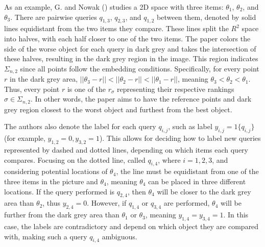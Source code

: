 \documentclass[
  letterpaper,
  numbers=noenddot,
  DIV=11]{scrreprt}
\theoremstyle{plain}
\theoremstyle{definition}
\theoremstyle{remark}
\begin{document}
As an example, G. and Nowak () studies a
2D space with three items: \(\theta_1\), \(\theta_2\), and \(\theta_3\).
There are pairwise queries \(q_{1,3}\), \(q_{2,3}\), and \(q_{1,2}\)
between them, denoted by solid lines equidistant from the two items they
compare. These lines split the \(R^2\) space into halves, with each half
closer to one of the two items. The paper colors the side of the worse
object for each query in dark grey and takes the intersection of these
halves, resulting in the dark grey region in the image. This region
indicates \(\Sigma_{n,2}\) since all points follow the embedding
conditions. Specifically, for every point \(r\) in the dark grey area,
\(||\theta_3 - r|| < ||\theta_2 - r|| < ||\theta_1 - r||\), meaning
\(\theta_3 < \theta_2 < \theta_1\). Thus, every point \(r\) is one of
the \(r_\sigma\) representing their respective rankings
\(\sigma \in \Sigma_{n,2}\). In other words, the paper aims to have the
reference points and dark grey region closest to the worst object and
furthest from the best object.

The authors also denote the label for each query \(q_{i,j}\), such as
label \(y_{i,j} = 1\{q_{i,j}\}\) (for example,
\(y_{1,2} = 0, y_{3,2} = 1\)). This allows for deciding how to label new
queries represented by dashed and dotted lines, depending on which items
each query compares. Focusing on the dotted line, called \(q_{i,4}\),
where \(i={1,2,3}\), and considering potential locations of
\(\theta_4\), the line must be equidistant from one of the three items
in the picture and \(\theta_4\), meaning \(\theta_4\) can be placed in
three different locations. If the query performed is \(q_{2,4}\), then
\(\theta_4\) will be closer to the dark grey area than \(\theta_2\),
thus \(y_{2,4} = 0\). However, if \(q_{1,4}\) or \(q_{3,4}\) are
performed, \(\theta_4\) will be further from the dark grey area than
\(\theta_1\) or \(\theta_3\), meaning \(y_{1,4} = y_{3,4} = 1\). In this
case, the labels are contradictory and depend on which object they are
compared with, making such a query \(q_{i,4}\) ambiguous.
\end{document}
